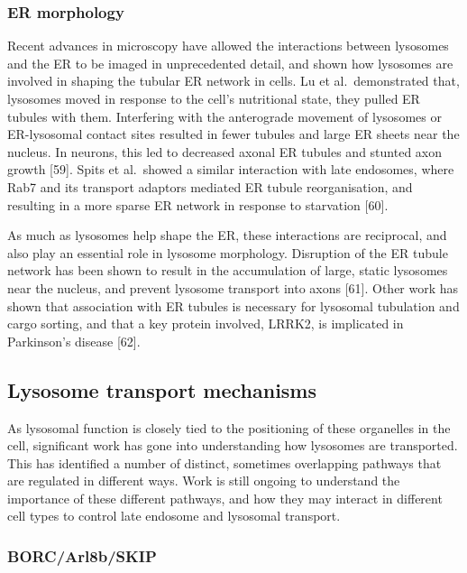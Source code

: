 \documentclass[
  12pt,
  a4paper,
]{book}
\begin{document}
\hypertarget{er-morphology}{%
\subsubsection{ER morphology}\label{er-morphology}}

Recent advances in microscopy have allowed the interactions between lysosomes and the ER to be imaged in unprecedented detail, and shown how lysosomes are involved in shaping the tubular ER network in cells. Lu et al.~demonstrated that, lysosomes moved in response to the cell's nutritional state, they pulled ER tubules with them. Interfering with the anterograde movement of lysosomes or ER-lysosomal contact sites resulted in fewer tubules and large ER sheets near the nucleus. In neurons, this led to decreased axonal ER tubules and stunted axon growth {[}59{]}. Spits et al.~showed a similar interaction with late endosomes, where Rab7 and its transport adaptors mediated ER tubule reorganisation, and resulting in a more sparse ER network in response to starvation {[}60{]}.

As much as lysosomes help shape the ER, these interactions are reciprocal, and also play an essential role in lysosome morphology. Disruption of the ER tubule network has been shown to result in the accumulation of large, static lysosomes near the nucleus, and prevent lysosome transport into axons {[}61{]}. Other work has shown that association with ER tubules is necessary for lysosomal tubulation and cargo sorting, and that a key protein involved, LRRK2, is implicated in Parkinson's disease {[}62{]}.

\hypertarget{lysosome-transport-mechanisms}{%
\subsection{Lysosome transport mechanisms}\label{lysosome-transport-mechanisms}}

As lysosomal function is closely tied to the positioning of these organelles in the cell, significant work has gone into understanding how lysosomes are transported. This has identified a number of distinct, sometimes overlapping pathways that are regulated in different ways. Work is still ongoing to understand the importance of these different pathways, and how they may interact in different cell types to control late endosome and lysosomal transport.

\hypertarget{borcarl8bskip}{%
\subsubsection{BORC/Arl8b/SKIP}\label{borcarl8bskip}}
\end{document}
